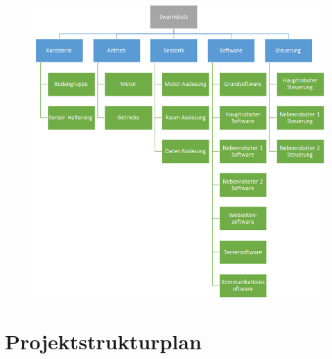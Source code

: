 \begin{figure}[H]
    \centering
    \includegraphics[width=\textwidth]{img/Projektobjektplan.png} 
    \caption{}
\end{figure}

\newpage

\section{Projektstrukturplan}

